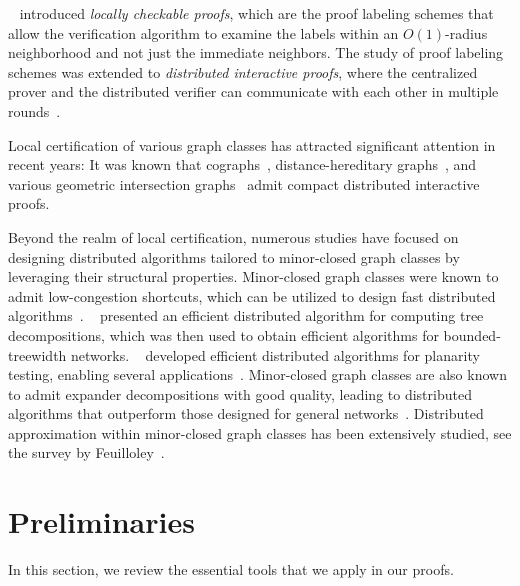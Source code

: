 \documentclass[11pt]{article}
\theoremstyle{definition}
\theoremstyle{remark}
\begin{document}
\citeauthor{v012a019}~\cite{v012a019} introduced \emph{locally checkable proofs}, which are the proof labeling schemes that allow the verification algorithm to examine the labels within an $O(1)$-radius neighborhood and not just the immediate neighbors.  The study of proof labeling schemes was extended to \emph{distributed interactive proofs}, where the centralized prover and the distributed verifier can communicate with each other in multiple rounds~\cite{kol2018interactive,naor2020power}.

Local certification of various graph classes has attracted
significant attention in recent years: It was known that cographs~\cite{montealegre2021compact}, distance-hereditary graphs~\cite{montealegre2021compact}, and various geometric intersection graphs~\cite{jauregui2022distributed} admit compact distributed interactive proofs.

Beyond the realm of local certification, numerous studies have focused on designing distributed algorithms tailored to minor-closed graph classes by leveraging their structural properties.
Minor-closed graph classes were known to admit low-congestion shortcuts, which can be utilized to design fast distributed algorithms~\cite{ghaffari2021low,haeupler2016low,haeupler2016near,haeupler2018minor}.
\citeauthor{IzumiSPAA22}~\cite{IzumiSPAA22} presented an efficient distributed algorithm for computing tree decompositions, which was then used to obtain efficient algorithms for bounded-treewidth networks. \citeauthor{ghaffari2016planar}~\cite{ghaffari2016planar} developed efficient distributed algorithms for planarity testing, enabling several applications~\cite{ghaffari2016distributed,levi2021property}.
Minor-closed graph classes are also known to admit expander decompositions with good quality, leading to distributed algorithms that outperform those designed for general networks~\cite{chang2023efficient,chang2022narrowing}. Distributed approximation within minor-closed graph classes has been extensively studied, see the survey by Feuilloley~\cite{feuilloley2020bibliography}.





\section{Preliminaries}\label{sect:prelim}

In this section, we review the essential tools that we apply in our proofs.
\end{document}
